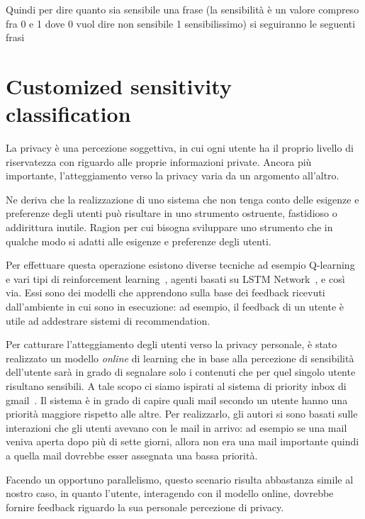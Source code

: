 Quindi per dire quanto sia sensibile una frase (la sensibilità è un valore compreso fra 0 e 1 dove 0 vuol dire non sensibile 1 sensibilissimo) si seguiranno le seguenti frasi

\section{Customized sensitivity classification}
\label{sec:pres_sens_class}
La privacy è una percezione soggettiva, in cui ogni utente ha il proprio livello di riservatezza con riguardo alle proprie informazioni private. Ancora più importante, l'atteggiamento verso la privacy varia da un argomento all'altro. 

Ne deriva che la realizzazione di uno sistema che non tenga conto delle esigenze e preferenze degli utenti può risultare in uno strumento ostruente, fastidioso o addirittura inutile. Ragion per cui bisogna sviluppare uno strumento che in qualche modo si adatti alle esigenze e preferenze degli utenti. 

Per effettuare questa operazione esistono diverse tecniche ad esempio Q-learning~\cite{q-learning} e vari tipi di reinforcement learning~\cite{reinfoce-learn}, agenti basati su LSTM Network~\cite{lstm}, e così via. Essi sono dei modelli che apprendono sulla base dei feedback ricevuti dall'ambiente in cui sono in esecuzione: ad esempio, il feedback di un utente è utile ad addestrare sistemi di recommendation.

Per catturare l'atteggiamento degli utenti verso la privacy personale, è stato realizzato un modello \textit{online} di learning che in base alla percezione di sensibilità dell'utente sarà in grado di segnalare solo i contenuti che per quel singolo utente risultano sensibili.
A tale scopo ci siamo ispirati al sistema di priority inbox di gmail~\cite{inbox}.
Il sistema è in grado di capire quali mail secondo un utente hanno una priorità maggiore rispetto alle altre. Per realizzarlo, gli autori si sono basati sulle interazioni che gli utenti avevano con le mail in arrivo: ad esempio se una mail veniva aperta dopo più di sette giorni, allora non era una mail importante quindi a quella mail dovrebbe esser assegnata una bassa priorità.

Facendo un opportuno parallelismo, questo scenario risulta abbastanza simile al nostro caso, in quanto l'utente, interagendo con il modello online, dovrebbe fornire feedback riguardo la sua personale percezione di privacy.

